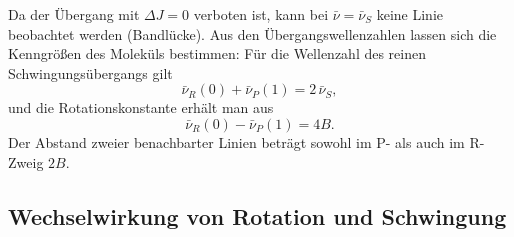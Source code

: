 \documentclass[11pt,a4paper]{article}
\newcommand{\wz}{\ensuremath{\bar{\nu}}}          %
\newcommand{\wzs}{\ensuremath{\bar{\nu}_S}}        %
\begin{document}
Da der Übergang mit $\Delta J = 0$ verboten ist, kann bei $\wz = \wzs$ keine
Linie beobachtet werden (Bandlücke). Aus den Übergangswellenzahlen lassen sich
die Kenngrößen des Moleküls bestimmen: Für die Wellenzahl des reinen
Schwingungsübergangs gilt
\begin{equation}
  \wz_R(0) + \wz_P(1) = 2\,\wzs ,
  \label{eq:nusbest}
\end{equation}
und die Rotationskonstante erhält man aus
\begin{equation}
  \wz_R(0) - \wz_P(1) = 4B .
  \label{eq:Bbest}
\end{equation}
Der Abstand zweier benachbarter Linien beträgt sowohl im P- als auch im R-Zweig
$2B$.

\subsection{Wechselwirkung von Rotation und Schwingung}
\label{sec:kopplung}
\end{document}
